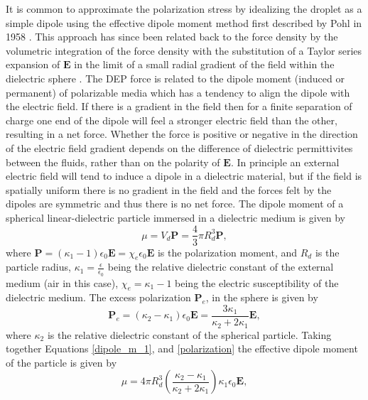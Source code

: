 \documentclass[12pt,a4paper,oneside]{book}
\begin{document}
It is common to approximate the polarization stress by idealizing the droplet as a simple dipole using the effective dipole moment method first described by Pohl in 1958 \cite{pohl_effects_1958}. This approach has since been related back to the force density by the volumetric integration of the force density with the substitution of a Taylor series expansion of $\mathbf{E}$ in the limit of a small radial gradient of the field within the dielectric sphere \cite{wang_general_1997}. The DEP force is related to the dipole moment (induced or permanent) of polarizable media which has a tendency to align the dipole with the electric field. If there is a gradient in the field then for a finite separation of charge one end of the dipole will feel a stronger electric field than the other, resulting in a net force. Whether the force is positive or negative in the direction of the electric field gradient depends on the difference of dielectric permittivites between the fluids, rather than on the polarity of $\mathbf{E}$. In principle an external electric field will tend to induce a dipole in a dielectric material, but if the field is spatially uniform there is no gradient in the field and the forces felt by the dipoles are symmetric and thus there is no net force. The dipole moment of a spherical linear-dielectric particle immersed in a dielectric medium is given by
\begin{equation} \label{dipole_m_1}
\mu = V_d \mathbf{P} = \frac{4}{3} \pi R_d^3 \mathbf{P},
\end{equation} 
where $\mathbf{P} = \left(\kappa_1 - 1 \right) \epsilon_0 \mathbf{E} = \chi_e \epsilon_0 \mathbf{E}$ is the polarization moment, and $R_d$ is the particle radius, $\kappa_1 = \frac{\epsilon}{\epsilon_0}$ being the relative dielectric constant of the external medium (air in this case), $\chi_e = \kappa_1 - 1$ being the electric susceptibility of the dielectric medium. The excess polarization $\mathbf{P}_e$, in the sphere is given by
\begin{equation} \label{polarization}
\mathbf{P}_e = \left( \kappa_2 - \kappa_1 \right) \epsilon_0 \mathbf{E} = \frac{3 \kappa_1}{\kappa_2 +2\kappa_1}\mathbf{E},
\end{equation}
where $\kappa_2$ is the relative dielectric constant of the spherical particle. Taking together Equations \ref{dipole_m_1}, and \ref{polarization} the effective dipole moment of the particle is given by 
\begin{equation}\label{dipole_m_2}
\mu = 4 \pi R_d^3 \left( \frac{\kappa_2 - \kappa_1}{\kappa_2 + 2 \kappa_1} \right) \kappa_1 \epsilon_0 \mathbf{E},
\end{equation}
\end{document}
